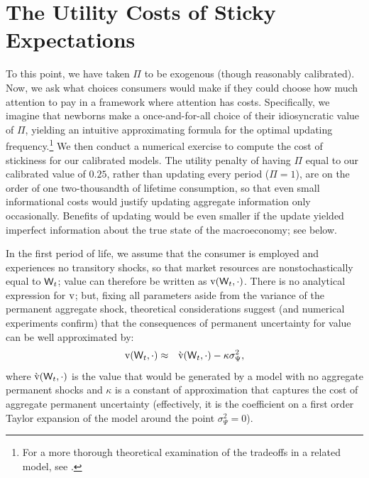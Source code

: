 \documentclass[titlepage]{./econtex}
\begin{document}
 
\hypertarget{Utility-Costs-Of-Sticky-Expectations}{}
\section{The Utility Costs of Sticky Expectations}\label{sec:uCost}

To this point, we have taken $\Pi$ to be exogenous (though reasonably calibrated).  Now, we ask what choices consumers would make if they could choose how much attention to pay in a framework where attention has costs.  Specifically, we imagine that newborns make a once-and-for-all choice of their idiosyncratic value of $\Pi$, yielding an intuitive approximating formula for the optimal updating frequency.\footnote{For a more thorough theoretical examination of the tradeoffs in a related model, see \cite{reis:inattentive}.}  We then conduct a numerical exercise to compute the cost of stickiness for our calibrated models.  The utility penalty of having $\Pi$ equal to our calibrated value of $0.25$, rather than updating every period ($\Pi=1$), are on the order of one two-thousandth of lifetime consumption, so that even small informational costs would justify updating aggregate information only occasionally.  Benefits of updating would be even smaller if the update yielded imperfect information about the true state of the macroeconomy; see below.

In the first period of life, we assume that the consumer is employed and experiences no transitory shocks, so that market resources are nonstochastically equal to $\mathsf{W}_t$; value can therefore be written as $\mathrm{v}(\mathsf{W}_t,\cdot)$.  There is no analytical expression for $\mathrm{v}$; but, fixing all parameters aside from the variance of the permanent aggregate shock, theoretical considerations suggest (and numerical experiments confirm) that the consequences of permanent uncertainty for value can be well approximated by:
\begin{eqnarray*}
   \mathrm{v}(\mathsf{W}_t,\cdot) & \approx & \grave{\mathrm{v}}(\mathsf{W}_t,\cdot) - \kappa \sigma^{2}_{\Psi}, \label{eq:vApprox}
\end{eqnarray*}
  where $\grave{\mathrm{v}}(\mathsf{W}_t,\cdot)$ is the value that would be generated by a model with no aggregate permanent shocks and $\kappa$ is a constant of approximation that captures the cost of aggregate permanent uncertainty (effectively, it is the coefficient on a first order Taylor expansion of the model around the point $\sigma_{\Psi}^{2}=0$).
\end{document}
